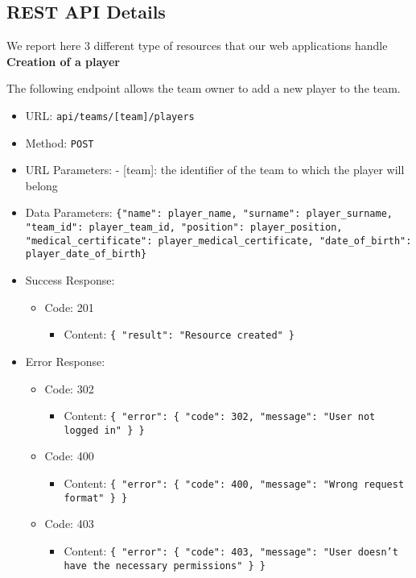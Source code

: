 \subsection{REST API Details}

We report here 3 different type of resources that our web applications handle\\
\textbf{Creation of a player}

The following endpoint allows the team owner to add a new player to the team.
\begin{itemize}
    \item URL: \texttt{api/teams/[team]/players}
    \item Method: \texttt{POST}
    \item URL Parameters: - [team]: the identifier of the team to which the player will belong
    \item Data Parameters: \texttt{\{"name": player\_name, "surname": player\_surname, "team\_id": player\_team\_id, "position": player\_position, "medical\_certificate": player\_medical\_certificate, "date\_of\_birth": player\_date\_of\_birth\}}
    \item Success Response: 
    \begin{itemize}
        \item Code: 201 
            \begin{itemize}
                \item Content: \texttt{\{ "result": "Resource created" \}}
            \end{itemize}
    \end{itemize}
    \item Error Response:
    \begin{itemize}
        \item Code: 302
            \begin{itemize}
                \item Content: \texttt{\{ "error": \{ "code": 302, "message": "User not logged in" \} \}}
            \end{itemize}
        
        \item Code: 400
            \begin{itemize}
                \item Content: \texttt{\{ "error": \{ "code": 400, "message": "Wrong request format" \} \}}
            \end{itemize}
        
        \item Code: 403
            \begin{itemize}
                \item Content: \texttt{\{ "error": \{ "code": 403, "message": "User doesn't have the necessary permissions" \} \}}
            \end{itemize}
        

\end{itemize}
\end{itemize}
